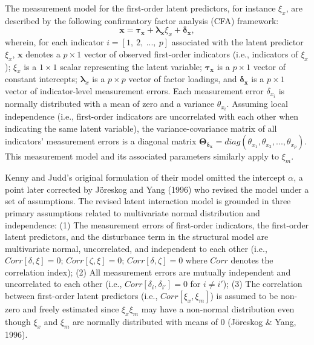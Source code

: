 \documentclass[
  man]{apa7}
\begin{document}
The measurement model for the first-order latent predictors, for instance \(\xi_{x}\), are described by the following confirmatory factor analysis (CFA) framework:
\begin{equation}
\mathbf{x} = \boldsymbol{\tau_{x}} + \boldsymbol{\lambda_{x}}\xi_{x} + \boldsymbol{\delta_{x}},
\end{equation}
wherein, for each indicator \(i = [1, \ 2, \ ..., \ p]\) associated with the latent predictor \(\xi_{x}\), \(\mathbf{x}\) denotes a \(p \times 1\) vector of observed first-order indicators (i.e., indicators of \(\xi_{x}\)); \(\xi_{x}\) is a \(1 \times 1\) scalar representing the latent variable; \(\boldsymbol{{\tau_{x}}}\) is a \(p \times 1\) vector of constant intercepts; \(\boldsymbol{\lambda}_{x}\) is a \(p \times p\) vector of factor loadings, and \(\boldsymbol{\delta_{x}}\) is a \(p \times 1\) vector of indicator-level measurement errors. Each measurement error \(\delta_{x_{i}}\) is normally distributed with a mean of zero and a variance \(\theta_{x_{i}}\). Assuming local independence (i.e., first-order indicators are uncorrelated with each other when indicating the same latent variable), the variance-covariance matrix of all indicators' measurement errors is a diagonal matrix \(\mathbf{\Theta_{\delta_{x}}} = diag(\theta_{x_{1}}, \theta_{x_{2}}, ..., \theta_{x_{p}})\). This measurement model and its associated parameters similarly apply to \(\xi_{m}\).

Kenny and Judd's original formulation of their model omitted the intercept \(\alpha\), a point later corrected by Jöreskog and Yang (1996) who revised the model under a set of assumptions. The revised latent interaction model is grounded in three primary assumptions related to multivariate normal distribution and independence: (1) The measurement errors of first-order indicators, the first-order latent predictors, and the disturbance term in the structural model are multivariate normal, uncorrelated, and independent to each other (i.e., \(Corr[\delta, \xi] = 0\); \(Corr[\zeta, \xi] = 0\); \(Corr[\delta, \zeta] = 0\) where \(Corr\) denotes the correlation index); (2) All measurement errors are mutually independent and uncorrelated to each other (i.e., \(Corr[\delta_{i}, \delta_{i'}] = 0\) for \(i \neq i'\)); (3) The correlation between first-order latent predictors (i.e., \(Corr[\xi_{x}, \xi_{m}]\)) is assumed to be non-zero and freely estimated since \(\xi_{x}\xi_{m}\) may have a non-normal distribution even though \(\xi_{x}\) and \(\xi_{m}\) are normally distributed with means of 0 (Jöreskog \& Yang, 1996).
\end{document}
